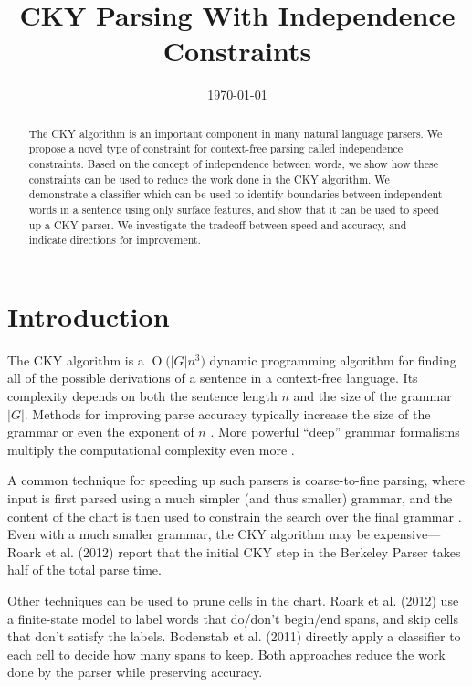 \documentclass[11pt]{article}
\date{\today}
\title{CKY Parsing With Independence Constraints}
\newcommand{\BigO}[1]{\ensuremath{\operatorname{O}\bigl(#1\bigr)}}
\begin{document}
\maketitle

\begin{abstract}
The CKY algorithm is an important component in many natural language
parsers. We propose a novel type of constraint for context-free
parsing called independence constraints. Based on the concept
of independence between words, we show how these constraints can be
used to reduce the work done in the CKY algorithm. We demonstrate a
classifier which can be used to identify boundaries between
independent words in a sentence using only surface features, and show
that it can be used to speed up a CKY parser. We investigate the
tradeoff between speed and accuracy, and indicate directions for
improvement.
\end{abstract}

\section{Introduction}
\label{sec-1}



The CKY algorithm is a \BigO{|G|n^3} dynamic programming
algorithm for finding all of the possible derivations of a sentence in
a context-free language. Its complexity depends on both the sentence
length $n$ and the size of the grammar $|G|$. Methods for improving
parse accuracy typically increase the size of the grammar 
\cite{Klein2003,Petrov2007} or even the exponent of $n$ \cite{Eisner1999}. 
More powerful “deep” grammar formalisms multiply the computational
complexity even more \cite{Bangalore1999}.

A common technique for speeding up such parsers is coarse-to-fine
parsing, where input is first parsed using a much simpler (and thus
smaller) grammar, and the content of the chart is then used to
constrain the search over the final grammar
\cite{Torisawa2000,Charniak2005,Petrov2007}. Even with a much smaller
grammar, the CKY algorithm may be expensive—Roark et al. (2012)
report that the initial CKY step in the Berkeley Parser takes half of
the total parse time.

Other techniques can be used to prune cells in the chart. Roark et al.
(2012) use a finite-state model to label words that do/don’t begin/end
spans, and skip cells that don’t satisfy the labels. Bodenstab et al.
(2011) directly apply a classifier to each cell to decide how many
spans to keep. Both approaches reduce the work done by the parser
while preserving accuracy.
\end{document}
